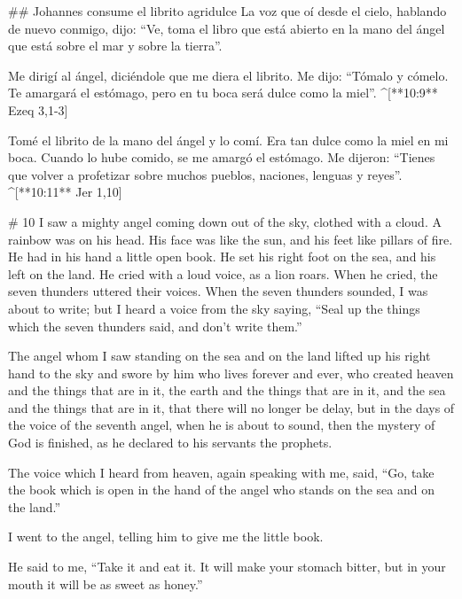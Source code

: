 \begin{paracols}{2}
## Johannes consume el librito agridulce
 La voz que oí desde el cielo, hablando de nuevo conmigo, dijo: “Ve, toma el libro que está abierto en la mano del ángel que está sobre el mar y sobre la tierra”.

 Me dirigí al ángel, diciéndole que me diera el librito. Me dijo: “Tómalo y cómelo. Te amargará el estómago, pero en tu boca será dulce como la miel”. ^[**10:9** Ezeq 3,1-3]

 Tomé el librito de la mano del ángel y lo comí. Era tan dulce como la miel en mi boca. Cuando lo hube comido, se me amargó el estómago.  Me dijeron: “Tienes que volver a profetizar sobre muchos pueblos, naciones, lenguas y reyes”. ^[**10:11** Jer 1,10]

\switchcolumn
\begin{english}

# 10
 I saw a mighty angel coming down out of the sky, clothed with a cloud. A rainbow was on his head. His face was like the sun, and his feet like pillars of fire.  He had in his hand a little open book. He set his right foot on the sea, and his left on the land.  He cried with a loud voice, as a lion roars. When he cried, the seven thunders uttered their voices.  When the seven thunders sounded, I was about to write; but I heard a voice from the sky saying, “Seal up the things which the seven thunders said, and don’t write them.” 

 The angel whom I saw standing on the sea and on the land lifted up his right hand to the sky  and swore by him who lives forever and ever, who created heaven and the things that are in it, the earth and the things that are in it, and the sea and the things that are in it, that there will no longer be delay,  but in the days of the voice of the seventh angel, when he is about to sound, then the mystery of God is finished, as he declared to his servants the prophets. 

 The voice which I heard from heaven, again speaking with me, said, “Go, take the book which is open in the hand of the angel who stands on the sea and on the land.” 

 I went to the angel, telling him to give me the little book. 

He said to me, “Take it and eat it. It will make your stomach bitter, but in your mouth it will be as sweet as honey.” 


\end{english}
\end{paracols}
